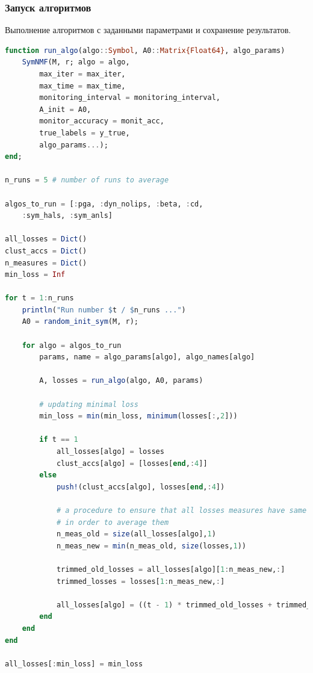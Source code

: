 \documentclass[a4paper,11pt]{article}
\begin{document}
\subsubsection{Запуск алгоритмов}
Выполнение алгоритмов с заданными параметрами и сохранение результатов.
\begin{lstlisting}[language=Julia, caption={Запуск алгоритмов}, label={lst:example3}]
function run_algo(algo::Symbol, A0::Matrix{Float64}, algo_params)
    SymNMF(M, r; algo = algo, 
        max_iter = max_iter, 
        max_time = max_time,
        monitoring_interval = monitoring_interval, 
        A_init = A0, 
        monitor_accuracy = monit_acc, 
        true_labels = y_true,
        algo_params...);
end;

n_runs = 5 # number of runs to average

algos_to_run = [:pga, :dyn_nolips, :beta, :cd,
    :sym_hals, :sym_anls]

all_losses = Dict()
clust_accs = Dict()
n_measures = Dict()
min_loss = Inf

for t = 1:n_runs
    println("Run number $t / $n_runs ...")
    A0 = random_init_sym(M, r);

    for algo = algos_to_run
        params, name = algo_params[algo], algo_names[algo]

        A, losses = run_algo(algo, A0, params)

        # updating minimal loss
        min_loss = min(min_loss, minimum(losses[:,2]))

        if t == 1
            all_losses[algo] = losses
            clust_accs[algo] = [losses[end,:4]]
        else
            push!(clust_accs[algo], losses[end,:4])

            # a procedure to ensure that all losses measures have same size,
            # in order to average them
            n_meas_old = size(all_losses[algo],1)
            n_meas_new = min(n_meas_old, size(losses,1))

            trimmed_old_losses = all_losses[algo][1:n_meas_new,:]
            trimmed_losses = losses[1:n_meas_new,:]

            all_losses[algo] = ((t - 1) * trimmed_old_losses + trimmed_losses) / t
        end
    end
end

all_losses[:min_loss] = min_loss
\end{lstlisting}
\end{document}
